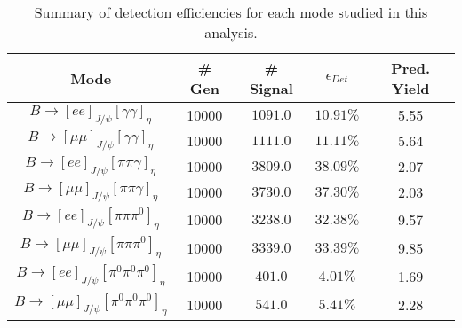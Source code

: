\begin{table}
    \caption{Summary of detection efficiencies for each mode studied in this analysis.}
    \label{tab:det_effs}
    \begin{tabular}{ccccc}
        \hline
        Mode & \# Gen & \# Signal & $\epsilon_{Det}$ & Pred. Yield \\\hline\hline
        $B\rightarrow[ee]_{J/\psi}[\gamma\gamma]_\eta$ & 10000 & $1091.0$ & $10.91\%$ & 5.55 \\

        $B\rightarrow[\mu\mu]_{J/\psi}[\gamma\gamma]_\eta$ & 10000 & $1111.0$ & $11.11\%$ & 5.64 \\

        $B\rightarrow[ee]_{J/\psi}[\pi\pi\gamma]_\eta$ & 10000 & $3809.0$ & $38.09\%$ & 2.07 \\

        $B\rightarrow[\mu\mu]_{J/\psi}[\pi\pi\gamma]_\eta$ & 10000 & $3730.0$ & $37.30\%$ & 2.03 \\

        $B\rightarrow[ee]_{J/\psi}[\pi\pi\pi^0]_\eta$ & 10000 & $3238.0$ & $32.38\%$ & 9.57 \\

        $B\rightarrow[\mu\mu]_{J/\psi}[\pi\pi\pi^0]_\eta$ & 10000 & $3339.0$ & $33.39\%$ & 9.85 \\

        $B\rightarrow[ee]_{J/\psi}[\pi^0\pi^0\pi^0]_\eta$ & 10000 & $401.0$ & $4.01\%$ & 1.69 \\

        $B\rightarrow[\mu\mu]_{J/\psi}[\pi^0\pi^0\pi^0]_\eta$ & 10000 & $541.0$ & $5.41\%$ & 2.28 \\

    \end{tabular}
\end{table}